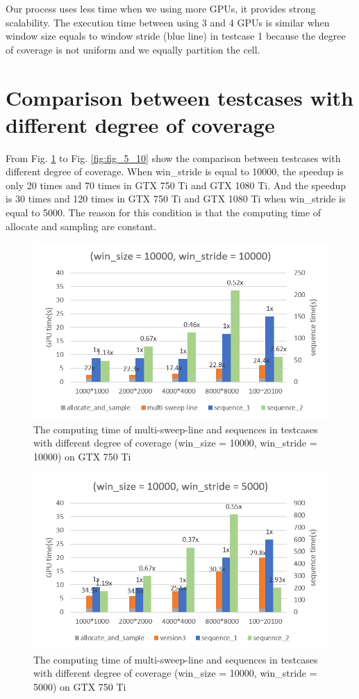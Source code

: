 Our process uses less time when we using more GPUs, it provides strong scalability. The execution time between using 3 and 4 GPUs is similar when window size equals to window stride (blue line) in testcase 1 because the degree of coverage is not uniform and we equally partition the cell.

\section{Comparison between testcases with different degree of coverage}
From Fig. \ref{fig:fig_5_7} to Fig. \ref{fig:fig_5_10} show the comparison between testcases with different degree of coverage. When win\_stride is equal to 10000, the speedup is only 20 times and 70 times in GTX 750 Ti and GTX 1080 Ti. And the speedup is 30 times and 120 times in GTX 750 Ti and GTX 1080 Ti when win\_stride is equal to 5000. The reason for this condition is that the computing time of allocate and sampling are constant.

\begin{figure}[!h]
    \centering
    \includegraphics[scale=0.7]{image/fig_5_7}
    \caption{The computing time of multi-sweep-line and sequences in testcases with different degree of coverage (win\_size = 10000, win\_stride = 10000) on GTX 750 Ti}
    \label{fig:fig_5_7}
\end{figure}

\begin{figure}[!h]
    \centering
    \includegraphics[scale=0.7]{image/fig_5_8}
    \caption{The computing time of multi-sweep-line and sequences in testcases with different degree of coverage (win\_size = 10000, win\_stride = 5000) on GTX 750 Ti}
    \label{fig:fig_5_8}
\end{figure}


